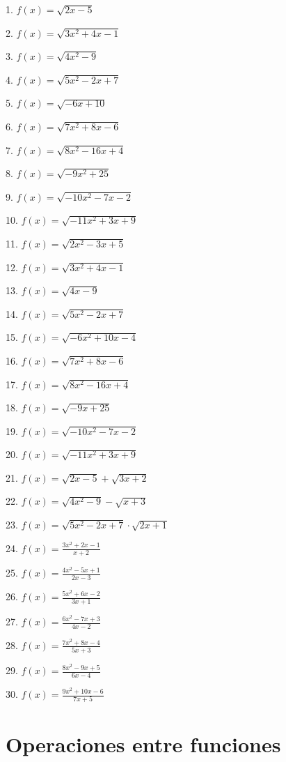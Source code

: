 \documentclass[]{book}
\begin{document}
\begin{multicols}{2}
1. $f(x) =\sqrt{2x - 5}$

2. $f(x) =\sqrt{3x^2 + 4x - 1}$

3. $f(x) =\sqrt{4x^2 - 9}$

4. $f(x) =\sqrt{5x^2 - 2x + 7}$

5. $f(x) =\sqrt{-6x + 10}$

6. $f(x) =\sqrt{7x^2 + 8x - 6}$

7. $f(x) =\sqrt{8x^2 - 16x + 4}$

8. $f(x) =\sqrt{-9x^2 + 25}$

9. $f(x) =\sqrt{-10x^2 - 7x - 2}$

10. $f(x) =\sqrt{-11x^2 + 3x + 9}$

11. $f(x) =\sqrt{2x^2 - 3x + 5}$

12. $f(x) =\sqrt{3x^2 + 4x - 1}$

13. $f(x) =\sqrt{4x - 9}$

14. $f(x) =\sqrt{5x^2 - 2x + 7}$

15. $f(x) =\sqrt{-6x^2 + 10x - 4}$

16. $f(x) =\sqrt{7x^2 + 8x - 6}$

17. $f(x) =\sqrt{8x^2 - 16x + 4}$

18. $f(x) =\sqrt{-9x + 25}$

19. $f(x) =\sqrt{-10x^2 - 7x - 2}$

20. $f(x) =\sqrt{-11x^2 + 3x + 9}$

21. $f(x) =\sqrt{2x - 5} +\sqrt{3x + 2}$

22. $f(x) =\sqrt{4x^2 - 9} -\sqrt{x + 3}$

23. $f(x) =\sqrt{5x^2 - 2x + 7} \cdot\sqrt{2x + 1}$

24. $f(x) =\frac{3x^2 + 2x - 1}{x + 2}$

25. $f(x) =\frac{4x^2 - 5x + 1}{2x - 3}$

26. $f(x) =\frac{5x^2 + 6x - 2}{3x + 1}$

27. $f(x) =\frac{6x^2 - 7x + 3}{4x - 2}$

28. $f(x) =\frac{7x^2 + 8x - 4}{5x + 3}$

29. $f(x) =\frac{8x^2 - 9x + 5}{6x - 4}$

30. $f(x) =\frac{9x^2 + 10x - 6}{7x + 5}$
\end{multicols}

\section{Operaciones entre funciones}\label{operaciones-entre-funciones}
\end{document}
